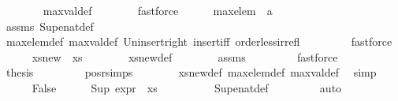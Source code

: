 \begin{isabellebody}
\ \ \ \ \ \ \isamarkupfalse%
\ max{\isacharunderscore}{\kern0pt}val{\isacharunderscore}{\kern0pt}def\isanewline
\ \ \ \ \ \ \isamarkupfalse%
\ fastforce\isanewline
\ \ \ \ \isamarkupfalse%
\ {\isachardoublequoteopen}max{\isacharunderscore}{\kern0pt}elem\ {\isacharequal}{\kern0pt}\ a{\isachardoublequoteclose}\isanewline
\ \ \ \ \ \ \isamarkupfalse%
\ assms\ Sup{\isacharunderscore}{\kern0pt}enat{\isacharunderscore}{\kern0pt}def\isanewline
\ \ \ \ \ \ \isamarkupfalse%
\ max{\isacharunderscore}{\kern0pt}elem{\isacharunderscore}{\kern0pt}def\ max{\isacharunderscore}{\kern0pt}val{\isacharunderscore}{\kern0pt}def\ Un{\isacharunderscore}{\kern0pt}insert{\isacharunderscore}{\kern0pt}right\ insert{\isacharunderscore}{\kern0pt}iff\ order{\isacharunderscore}{\kern0pt}less{\isacharunderscore}{\kern0pt}irrefl\ \isanewline
\ \ \ \ \ \ \isamarkupfalse%
\ fastforce\ \isanewline
\ \ \ \ \isamarkupfalse%
\ {\isachardoublequoteopen}xs{\isacharunderscore}{\kern0pt}new\ {\isacharequal}{\kern0pt}\ xs{\isachardoublequoteclose}\isanewline
\ \ \ \ \ \ \isamarkupfalse%
\ xs{\isacharunderscore}{\kern0pt}new{\isacharunderscore}{\kern0pt}def\isanewline
\ \ \ \ \ \ \isamarkupfalse%
\ assms\ \isanewline
\ \ \ \ \ \ \isamarkupfalse%
\ fastforce\isanewline
\ \ \ \ \isamarkupfalse%
\ \isamarkupfalse%
\ {\isacharquery}{\kern0pt}thesis\ \isanewline
\ \ \ \ \ \ \isamarkupfalse%
\ pos{\isacharunderscore}{\kern0pt}r{\isachardot}{\kern0pt}simps\isanewline
\ \ \ \ \ \ \isamarkupfalse%
\ xs{\isacharunderscore}{\kern0pt}new{\isacharunderscore}{\kern0pt}def\ max{\isacharunderscore}{\kern0pt}elem{\isacharunderscore}{\kern0pt}def\ max{\isacharunderscore}{\kern0pt}val{\isacharunderscore}{\kern0pt}def\ \isamarkupfalse%
\ simp\ \isanewline
\ \ \isamarkupfalse%
\isanewline
\ \ \ \ \isamarkupfalse%
\ False\isanewline
\ \ \ \ \isamarkupfalse%
\ {\isachardoublequoteopen}Sup\ {\isacharparenleft}{\kern0pt}expr{\isacharunderscore}{\kern0pt}{}\ {\isacharbackquote}{\kern0pt}\ xs{\isacharparenright}{\kern0pt}\ {\isacharequal}{\kern0pt}\ {\isasyminfinity}{\isachardoublequoteclose}\isanewline
\ \ \ \ \ \ \isamarkupfalse%
\ Sup{\isacharunderscore}{\kern0pt}enat{\isacharunderscore}{\kern0pt}def\ \isanewline
\ \ \ \ \ \ \isamarkupfalse%
\ auto\isanewline
\ \ \ \ \isamarkupfalse%

\end{isabellebody}
